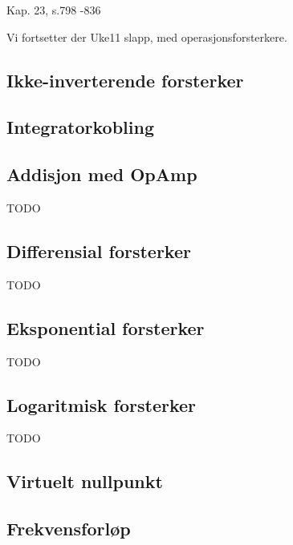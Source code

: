 Kap. 23, s.798 -836

Vi fortsetter der Uke11 slapp, med operasjonsforsterkere.

\subsection{Ikke-inverterende forsterker}
  
\subsection{Integratorkobling}
  
\subsection{Addisjon med OpAmp}
  TODO
\subsection{Differensial forsterker}
  TODO
\subsection{Eksponential forsterker}
  TODO
\subsection{Logaritmisk forsterker}
  TODO
\subsection{Virtuelt nullpunkt}
  
\subsection{Frekvensforløp}
  
